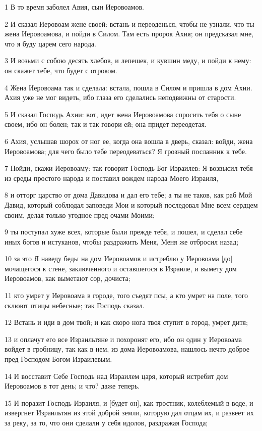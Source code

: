 \par 1 В то время заболел Авия, сын Иеровоамов.
\par 2 И сказал Иеровоам жене своей: встань и переоденься, чтобы не узнали, что ты жена Иеровоамова, и пойди в Силом. Там есть пророк Ахия; он предсказал мне, что я буду царем сего народа.
\par 3 И возьми с собою десять хлебов, и лепешек, и кувшин меду, и пойди к нему: он скажет тебе, что будет с отроком.
\par 4 Жена Иеровоама так и сделала: встала, пошла в Силом и пришла в дом Ахии. Ахия уже не мог видеть, ибо глаза его сделались неподвижны от старости.
\par 5 И сказал Господь Ахии: вот, идет жена Иеровоамова спросить тебя о сыне своем, ибо он болен; так и так говори ей; она придет переодетая.
\par 6 Ахия, услышав шорох от ног ее, когда она вошла в дверь, сказал: войди, жена Иеровоамова; для чего было тебе переодеваться? Я грозный посланник к тебе.
\par 7 Пойди, скажи Иеровоаму: так говорит Господь Бог Израилев: Я возвысил тебя из среды простого народа и поставил вождем народа Моего Израиля,
\par 8 и отторг царство от дома Давидова и дал его тебе; а ты не таков, как раб Мой Давид, который соблюдал заповеди Мои и который последовал Мне всем сердцем своим, делая только угодное пред очами Моими;
\par 9 ты поступал хуже всех, которые были прежде тебя, и пошел, и сделал себе иных богов и истуканов, чтобы раздражить Меня, Меня же отбросил назад;
\par 10 за это Я наведу беды на дом Иеровоамов и истреблю у Иеровоама [до] мочащегося к стене, заключенного и оставшегося в Израиле, и вымету дом Иеровоамов, как выметают сор, дочиста;
\par 11 кто умрет у Иеровоама в городе, того съедят псы, а кто умрет на поле, того склюют птицы небесные; так Господь сказал.
\par 12 Встань и иди в дом твой; и как скоро нога твоя ступит в город, умрет дитя;
\par 13 и оплачут его все Израильтяне и похоронят его, ибо он один у Иеровоама войдет в гробницу, так как в нем, из дома Иеровоамова, нашлось нечто доброе пред Господом Богом Израилевым.
\par 14 И восставит Себе Господь над Израилем царя, который истребит дом Иеровоамов в тот день; и что? даже теперь.
\par 15 И поразит Господь Израиля, и [будет он], как тростник, колеблемый в воде, и извергнет Израильтян из этой доброй земли, которую дал отцам их, и развеет их за реку, за то, что они сделали у себя идолов, раздражая Господа;
